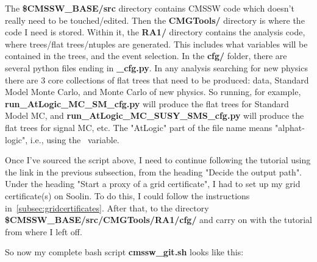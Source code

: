 The \textbf{\$CMSSW\_BASE/src} directory contains CMSSW code which doesn't really need to be touched/edited. Then the \textbf{CMGTools/} directory is where the code I need is stored. Within it, the \textbf{RA1/} directory contains the analysis code, where trees/flat trees/ntuples are generated. This includes what variables will be contained in the trees, and the event selection. In the \textbf{cfg/} folder, there are several python files ending in \textbf{\_cfg.py}. In any analysis searching for new physics there are 3 core collections of flat trees that need to be produced: data, Standard Model Monte Carlo, and Monte Carlo of new physics. So running, for example, \textbf{run\_AtLogic\_MC\_SM\_cfg.py} will produce the flat trees for Standard Model MC, and \textbf{run\_AtLogic\_MC\_SUSY\_SMS\_cfg.py} will produce the flat trees for signal MC, etc. The "AtLogic" part of the file name means "alphat-logic", i.e., using the \alphat\ variable.

Once I've sourced the script above, I need to continue following the tutorial using the link in the previous subsection, from the heading "Decide the output path". Under the heading "Start a proxy of a grid certificate", I had to set up my grid certificate(s) on Soolin. To do this, I could follow the instructions in~\ref{subsec:gridcertificates}. After that, to the directory \textbf{\$CMSSW\_BASE/src/CMGTools/RA1/cfg/} and carry on with the tutorial from where I left off.


So now my complete bash script \textbf{cmssw\_git.sh} looks like this:



